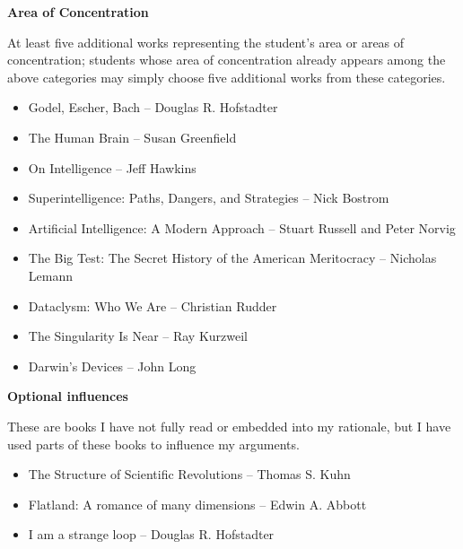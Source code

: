 \documentclass[11pt]{article}
\begin{document}
\par \textbf{Area of Concentration}
\par At least five additional works representing the student's area or areas of concentration; students whose area of concentration already appears among the above categories may simply choose five additional works from these categories.
\begin{itemize}
	\item Godel, Escher, Bach -- Douglas R. Hofstadter
	\item The Human Brain -- Susan Greenfield
	\item On Intelligence -- Jeff Hawkins
	\item Superintelligence: Paths, Dangers, and Strategies -- Nick Bostrom
	\item Artificial Intelligence: A Modern Approach -- Stuart Russell and Peter Norvig
	\item The Big Test: The Secret History of the American Meritocracy -- Nicholas Lemann
	\item Dataclysm: Who We Are -- Christian Rudder
	\item The Singularity Is Near -- Ray Kurzweil
	\item Darwin's Devices -- John Long
\end{itemize}

\par \textbf{Optional influences}
\par These are books I have not fully read or embedded into my rationale, but I have used parts of these books to influence my arguments.
\begin{itemize}
	\item The Structure of Scientific Revolutions -- Thomas S. Kuhn
	\item Flatland: A romance of many dimensions -- Edwin A. Abbott
	\item I am a strange loop -- Douglas R. Hofstadter
\end{itemize}
\end{document}
